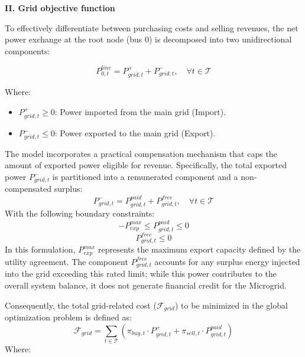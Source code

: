 \documentclass[preprint,12pt]{elsarticle}
\begin{document}
\textbf{II. Grid  objective function}

To effectively differentiate between purchasing costs and selling revenues, the net power exchange at the root node (bus 0) is decomposed into two unidirectional components:

\begin{equation}
P_{0,t}^{line} = P_{grid,t}^{+} + P_{grid,t}^{-}, \quad \forall t \in \mathcal{T}
\label{eq:grid_decomposition}
\end{equation}

Where:
\begin{itemize}
    \item $P_{grid,t}^{+} \ge 0$: Power imported from the main grid (Import).
    \item $P_{grid,t}^{-} \le 0$: Power exported to the main grid (Export).
\end{itemize}

The model incorporates a practical compensation mechanism that caps the amount of exported power eligible for revenue. Specifically, the total exported power $P_{grid,t}^{-}$ is partitioned into a remunerated component and a non-compensated surplus:
\begin{equation}
P_{grid,t}^{-} = P_{grid,t}^{paid} + P_{grid,t}^{free}, \quad \forall t \in \mathcal{T}
\label{eq:export_decomposition}
\end{equation}
With the following boundary constraints:
\begin{equation}
-P_{exp}^{max} \le P_{grid,t}^{paid} \le 0
\label{eq:paid_limit}
\end{equation}
\begin{equation}
P_{grid,t}^{free} \le 0
\label{eq:free_limit}
\end{equation}
In this formulation, $P_{exp}^{max}$ represents the maximum export capacity defined by the utility agreement. The component $P_{grid,t}^{free}$ accounts for any surplus energy injected into the grid exceeding this rated limit; while this power contributes to the overall system balance, it does not generate financial credit for the Microgrid.

Consequently, the total grid-related cost ($\mathcal{F}_{grid}$) to be minimized in the global optimization problem is defined as:
\begin{equation}
\mathcal{F}_{grid} = \sum \limits_{t \in \mathcal{T}} \left( \pi_{buy,t} \cdot P_{grid,t}^{+} + \pi_{sell,t} \cdot P_{grid,t}^{paid} \right)
\label{eq:grid_objective}
\end{equation}
Where:
\end{document}
